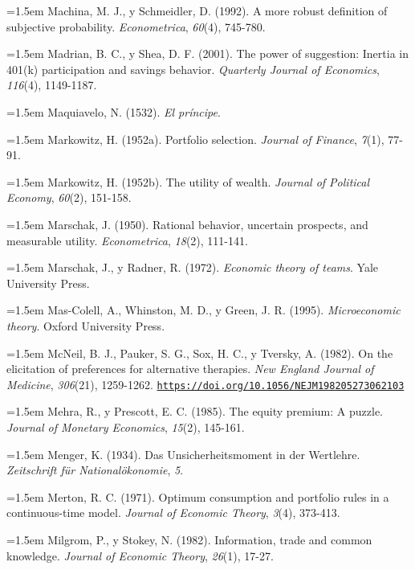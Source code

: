 \documentclass[10pt,a4paper]{article}
\begin{document}
\noindent\hangindent=1.5em Machina, M. J., y Schmeidler, D. (1992). A more robust definition of subjective probability. \textit{Econometrica}, \textit{60}(4), 745-780.

\noindent\hangindent=1.5em Madrian, B. C., y Shea, D. F. (2001). The power of suggestion: Inertia in 401(k) participation and savings behavior. \textit{Quarterly Journal of Economics}, \textit{116}(4), 1149-1187.

\noindent\hangindent=1.5em Maquiavelo, N. (1532). \textit{El príncipe}.

\noindent\hangindent=1.5em Markowitz, H. (1952a). Portfolio selection. \textit{Journal of Finance}, \textit{7}(1), 77-91.

\noindent\hangindent=1.5em Markowitz, H. (1952b). The utility of wealth. \textit{Journal of Political Economy}, \textit{60}(2), 151-158.

\noindent\hangindent=1.5em Marschak, J. (1950). Rational behavior, uncertain prospects, and measurable utility. \textit{Econometrica}, \textit{18}(2), 111-141.

\noindent\hangindent=1.5em Marschak, J., y Radner, R. (1972). \textit{Economic theory of teams}. Yale University Press.

\noindent\hangindent=1.5em Mas-Colell, A., Whinston, M. D., y Green, J. R. (1995). \textit{Microeconomic theory}. Oxford University Press.

\noindent\hangindent=1.5em McNeil, B. J., Pauker, S. G., Sox, H. C., y Tversky, A. (1982). On the elicitation of preferences for alternative therapies. \textit{New England Journal of Medicine}, \textit{306}(21), 1259-1262. \href{https://doi.org/10.1056/NEJM198205273062103}{\nolinkurl{https://doi.org/10.1056/NEJM198205273062103}}

\noindent\hangindent=1.5em Mehra, R., y Prescott, E. C. (1985). The equity premium: A puzzle. \textit{Journal of Monetary Economics}, \textit{15}(2), 145-161.

\noindent\hangindent=1.5em Menger, K. (1934). Das Unsicherheitsmoment in der Wertlehre. \textit{Zeitschrift für Nationalökonomie}, \textit{5}.

\noindent\hangindent=1.5em Merton, R. C. (1971). Optimum consumption and portfolio rules in a continuous-time model. \textit{Journal of Economic Theory}, \textit{3}(4), 373-413.

\noindent\hangindent=1.5em Milgrom, P., y Stokey, N. (1982). Information, trade and common knowledge. \textit{Journal of Economic Theory}, \textit{26}(1), 17-27.
\end{document}
